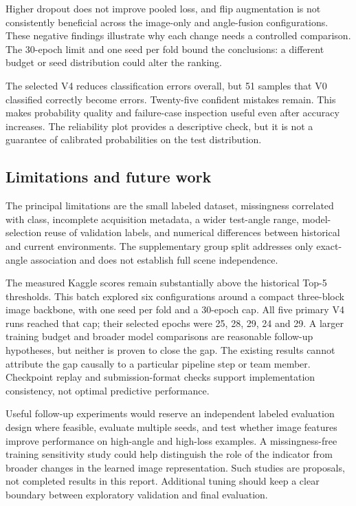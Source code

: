 \documentclass[journal]{IEEEtran}
\begin{document}
Higher dropout does not improve pooled loss, and flip augmentation is not consistently beneficial across the image-only and angle-fusion configurations. These negative findings illustrate why each change needs a controlled comparison. The 30-epoch limit and one seed per fold bound the conclusions: a different budget or seed distribution could alter the ranking.

The selected V4 reduces classification errors overall, but 51 samples that V0 classified correctly become errors. Twenty-five confident mistakes remain. This makes probability quality and failure-case inspection useful even after accuracy increases. The reliability plot provides a descriptive check, but it is not a guarantee of calibrated probabilities on the test distribution.

\subsection{Limitations and future work}
The principal limitations are the small labeled dataset, missingness correlated with class, incomplete acquisition metadata, a wider test-angle range, model-selection reuse of validation labels, and numerical differences between historical and current environments. The supplementary group split addresses only exact-angle association and does not establish full scene independence.

The measured Kaggle scores remain substantially above the historical Top-5 thresholds. This batch explored six configurations around a compact three-block image backbone, with one seed per fold and a 30-epoch cap. All five primary V4 runs reached that cap; their selected epochs were 25, 28, 29, 24 and 29. A larger training budget and broader model comparisons are reasonable follow-up hypotheses, but neither is proven to close the gap. The existing results cannot attribute the gap causally to a particular pipeline step or team member. Checkpoint replay and submission-format checks support implementation consistency, not optimal predictive performance.

Useful follow-up experiments would reserve an independent labeled evaluation design where feasible, evaluate multiple seeds, and test whether image features improve performance on high-angle and high-loss examples. A missingness-free training sensitivity study could help distinguish the role of the indicator from broader changes in the learned image representation. Such studies are proposals, not completed results in this report. Additional tuning should keep a clear boundary between exploratory validation and final evaluation.
\end{document}
